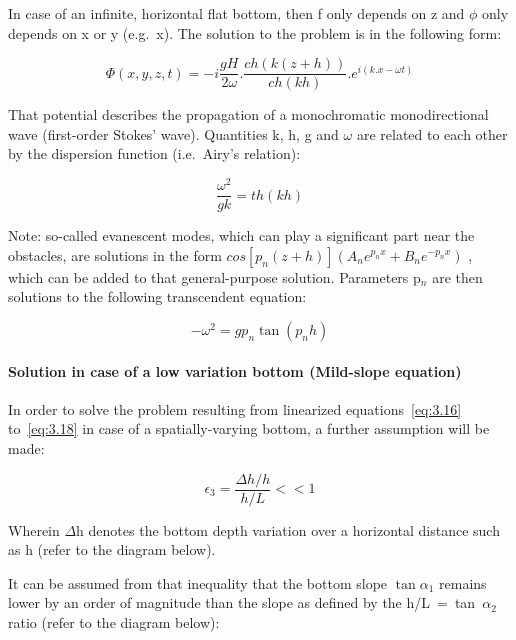 In case of an infinite, horizontal flat bottom, then f only depends on z and
$\phi$ only depends on x or y (e.g.\ x). The solution to the problem is in the
following form:

\begin{equation}
  \Phi(x,y,z,t) = -i \frac{gH}{2\omega}.\frac{ch(k(z+h))}{ch(kh)}.e^{i(k.x-\omega t)}
  \label{eq:3.20}
\end{equation}

That potential describes the propagation of a monochromatic monodirectional
wave (first-order Stokes' wave). Quantities k, h, g and $\omega$ are related to
each other by the dispersion function (i.e.\ Airy's relation):

\begin{equation}
  \frac{\omega^{2}}{gk} = th(kh)
  \label{eq:3.21}
\end{equation}

Note: so-called evanescent modes, which can play a significant part near the
obstacles, are solutions in the form
$cos[p_{n}(z+h)](A_{n}e^{p_{n}x}+B_{n}e^{-p_{n}x})$ , which can be added to
that general-purpose solution. Parameters p${}_{n}$ are then solutions to the
following transcendent equation:

\begin{equation}
  -\omega^{2} = gp_{n}\tan(p_{n}h)
\end{equation}

\paragraph{Solution in case of a low variation bottom (Mild-slope equation)}\label{low_var_bot}

In order to solve the problem resulting from linearized
equations~\eqref{eq:3.16} to~\eqref{eq:3.18} in case of a spatially-varying
bottom, a further assumption will be made:

\[ \epsilon_{3} = \frac{\Delta h/h}{h/L} << 1 \]

Wherein $\Delta$h denotes the bottom depth variation over a horizontal distance
such as h (refer to the diagram below).

It can be assumed from that inequality that the bottom slope
$\tan\alpha_{1}$ remains lower by an order of magnitude than the slope as
defined by the h/L~=~tan~$\alpha_{2}$ ratio (refer to the diagram below):


